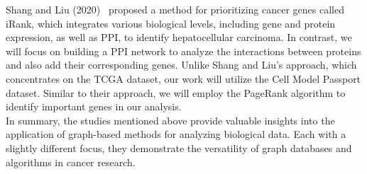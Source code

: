 Shang and Liu (2020)~\cite{shan2020network} proposed a method for prioritizing cancer genes called iRank,
which integrates various biological levels, including gene and protein expression, as well as PPI,
to identify hepatocellular carcinoma.
In contrast, we will focus on building a PPI network to analyze the interactions between proteins and also add their corresponding genes.
Unlike Shang and Liu's approach, which concentrates on the TCGA dataset, our work will utilize the Cell Model Passport dataset.
Similar to their approach, we will employ the PageRank algorithm to identify important genes in our analysis.
\\

In summary, the studies mentioned above provide valuable insights into the application of graph-based methods for analyzing biological data.
Each with a slightly different focus, they demonstrate the versatility of graph databases and algorithms in cancer research.
\\
